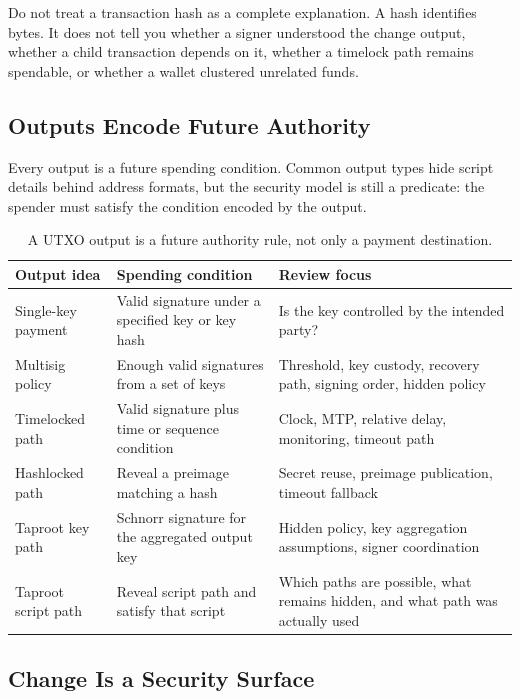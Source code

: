 Do not treat a transaction hash as a complete explanation. A hash identifies bytes. It does not tell you whether a signer understood the change output, whether a child transaction depends on it, whether a timelock path remains spendable, or whether a wallet clustered unrelated funds.

\subsection{Outputs Encode Future Authority}

Every output is a future spending condition. Common output types hide script details behind address formats, but the security model is still a predicate: the spender must satisfy the condition encoded by the output.

\begin{table}[htbp]
\centering
\small
\renewcommand{\arraystretch}{1.18}
\begin{tabularx}{\textwidth}{@{}>{\RaggedRight\arraybackslash}p{}>{\RaggedRight\arraybackslash}p{}X@{}}
\toprule
Output idea & Spending condition & Review focus \\
\midrule
Single-key payment & Valid signature under a specified key or key hash & Is the key controlled by the intended party? \\
Multisig policy & Enough valid signatures from a set of keys & Threshold, key custody, recovery path, signing order, hidden policy \\
Timelocked path & Valid signature plus time or sequence condition & Clock, MTP, relative delay, monitoring, timeout path \\
Hashlocked path & Reveal a preimage matching a hash & Secret reuse, preimage publication, timeout fallback \\
Taproot key path & Schnorr signature for the aggregated output key & Hidden policy, key aggregation assumptions, signer coordination \\
Taproot script path & Reveal script path and satisfy that script & Which paths are possible, what remains hidden, and what path was actually used \\
\bottomrule
\end{tabularx}
\caption{A UTXO output is a future authority rule, not only a payment destination.}
\end{table}

\subsection{Change Is a Security Surface}

